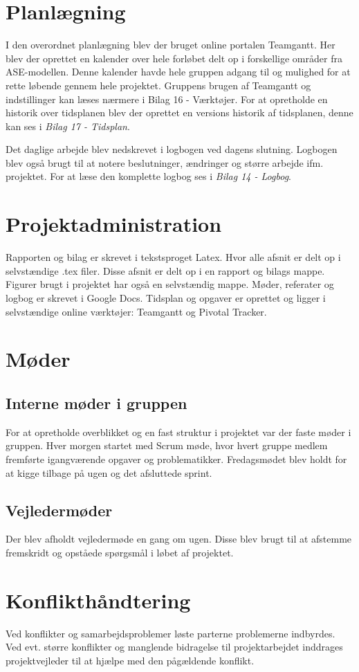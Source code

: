 \chapter{Planlægning}
I den overordnet planlægning blev der bruget online portalen Teamgantt. Her blev der
oprettet en kalender over hele forløbet delt op i forskellige områder fra ASE-modellen.
Denne kalender havde hele gruppen adgang til og mulighed for at rette løbende gennem
hele projektet. Gruppens brugen af Teamgantt og indstillinger kan læses nærmere i Bilag
16 - Værktøjer. For at opretholde en historik over tidsplanen blev der oprettet en versions
historik af tidsplanen, denne kan ses i \textit{Bilag 17 - Tidsplan}.

Det daglige arbejde blev nedskrevet i logbogen ved dagens slutning. Logbogen blev også
brugt til at notere beslutninger, ændringer og større arbejde ifm. projektet. For at læse
den komplette logbog ses i \textit{Bilag 14 - Logbog}.




\chapter{Projektadministration}
Rapporten og bilag er skrevet i tekstsproget Latex. Hvor alle afsnit er delt op i selvstændige
.tex filer. Disse afsnit er delt op i en rapport og bilags mappe. Figurer brugt i projektet har
også en selvstændig mappe. Møder, referater og logbog er skrevet i Google Docs. Tidsplan
og opgaver er oprettet og ligger i selvstændige online værktøjer: Teamgantt og Pivotal
Tracker.


\chapter{Møder}
\section{Interne møder i gruppen}
For at opretholde overblikket og en fast struktur i projektet var der faste møder i gruppen. Hver morgen startet med Scrum møde, hvor hvert gruppe medlem fremførte igangværende opgaver og problematikker. Fredagsmødet blev holdt for at kigge tilbage på ugen og det afsluttede sprint. 

\section{Vejledermøder}
Der blev afholdt vejledermøde en gang om ugen. Disse blev brugt til at afstemme fremskridt og opståede spørgsmål i løbet af projektet.



\chapter{Konflikthåndtering}
Ved konflikter og samarbejdsproblemer løste parterne problemerne indbyrdes. Ved evt. større konflikter og manglende bidragelse til projektarbejdet inddrages projektvejleder til at hjælpe med den pågældende konflikt. 









